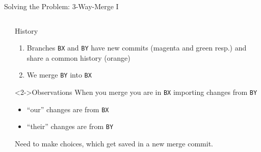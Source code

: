\documentclass[xetex]{beamer}
\begin{document}
\begin{frame}[fragile]{Solving the Problem: 3-Way-Merge I}
\begin{columns}
\begin{column}{.5\linewidth}
    \end{column}
    \begin{column}{.5\linewidth}
      \begin{exampleblock}{History}
        \begin{enumerate}
          \item Branches \texttt{BX} and \texttt{BY} have new commits (magenta
            and green resp.) and share a common history (orange)
          \item We merge \texttt{BY} into \texttt{BX}
        \end{enumerate}
      \end{exampleblock}
      \begin{alertblock}<2->{Observations}
        When you merge you are in \texttt{BX} importing changes from \texttt{BY}
        \begin{itemize}
          \item ``our'' changes are from \texttt{BX}
          \item ``their'' changes are from \texttt{BY}
        \end{itemize}
        Need to make choices, which get saved in a new merge commit.
      \end{alertblock}
    \end{column}
  \end{columns}
\end{frame}
\end{document}
